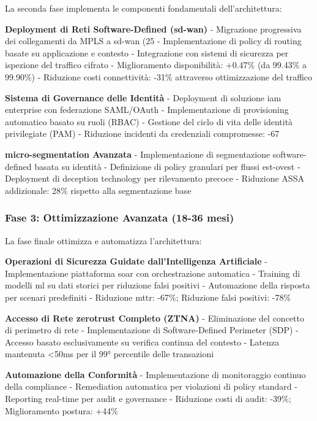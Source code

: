 La seconda fase implementa le componenti fondamentali dell'architettura:

\textbf{Deployment di Reti Software-Defined (\gls{sd-wan})}
- Migrazione progressiva dei collegamenti da MPLS a \gls{sd-wan} (25%
- Implementazione di policy di routing basate su applicazione e contesto
- Integrazione con sistemi di sicurezza per ispezione del traffico cifrato
- Miglioramento disponibilità: +0.47\% (da 99.43\% a 99.90\%)
- Riduzione costi connettività: -31\% attraverso ottimizzazione del traffico

\textbf{Sistema di Governance delle Identità}
- Deployment di soluzione \gls{iam} enterprise con federazione SAML/OAuth
- Implementazione di provisioning automatico basato su ruoli (RBAC)
- Gestione del ciclo di vita delle identità privilegiate (PAM)
- Riduzione incidenti da credenziali compromesse: -67%

\textbf{\gls{micro-segmentation} Avanzata}
- Implementazione di segmentazione software-defined basata su identità
- Definizione di policy granulari per flussi est-ovest
- Deployment di deception technology per rilevamento precoce
- Riduzione ASSA addizionale: 28\% rispetto alla segmentazione base

\subsubsection{\texorpdfstring{Fase 3: Ottimizzazione Avanzata (18-36 mesi)}{2.6.1.3 - Fase 3: Ottimizzazione Avanzata (18-36 mesi)}}

La fase finale ottimizza e automatizza l'architettura:

\textbf{Operazioni di Sicurezza Guidate dall'Intelligenza Artificiale}
- Implementazione piattaforma \gls{soar} con orchestrazione automatica
- Training di modelli \gls{ml} su dati storici per riduzione falsi positivi
- Automazione della risposta per scenari predefiniti
- Riduzione \gls{mttr}: -67\%; Riduzione falsi positivi: -78\%

\textbf{Accesso di Rete \gls{zerotrust} Completo (ZTNA)}
- Eliminazione del concetto di perimetro di rete
- Implementazione di Software-Defined Perimeter (SDP)
- Accesso basato esclusivamente su verifica continua del contesto
- Latenza mantenuta <50ms per il 99° percentile delle transazioni

\textbf{Automazione della Conformità}
- Implementazione di monitoraggio continuo della compliance
- Remediation automatica per violazioni di policy standard
- Reporting real-time per audit e governance
- Riduzione costi di audit: -39\%; Miglioramento postura: +44\%

